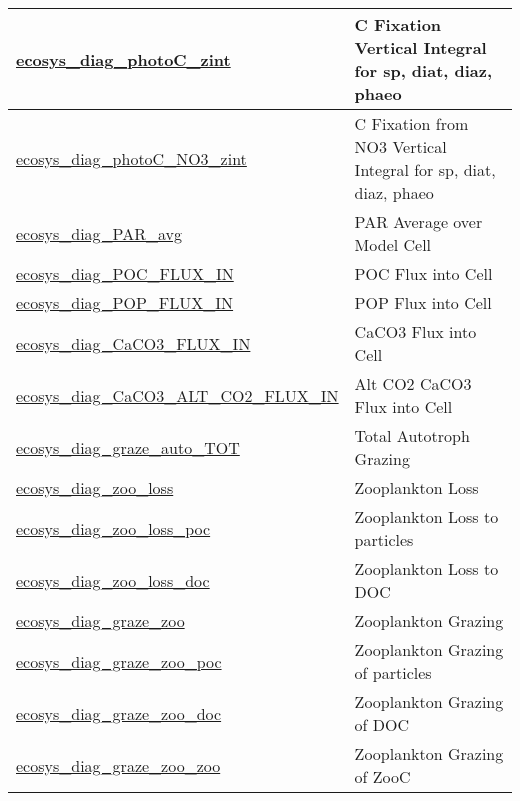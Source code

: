 {\begin{center}
\begin{longtable}{| p{2.0in} | p{4.0in} |}
    \hline
    \hyperref[subsec:var_sec_forcing_ecosys_diag_photoC_zint]{ecosys\_diag\_photoC\_zint} & C Fixation Vertical Integral for sp, diat, diaz, phaeo \\
    \hline
    \hyperref[subsec:var_sec_forcing_ecosys_diag_photoC_NO3_zint]{ecosys\_diag\_photoC\_NO3\_zint} & C Fixation from NO3 Vertical Integral for sp, diat, diaz, phaeo \\
    \hline
    \hyperref[subsec:var_sec_forcing_ecosys_diag_PAR_avg]{ecosys\_diag\_PAR\_avg} & PAR Average over Model Cell \\
    \hline
    \hyperref[subsec:var_sec_forcing_ecosys_diag_POC_FLUX_IN]{ecosys\_diag\_POC\_FLUX\_IN} & POC Flux into Cell \\
    \hline
    \hyperref[subsec:var_sec_forcing_ecosys_diag_POP_FLUX_IN]{ecosys\_diag\_POP\_FLUX\_IN} & POP Flux into Cell \\
    \hline
    \hyperref[subsec:var_sec_forcing_ecosys_diag_CaCO3_FLUX_IN]{ecosys\_diag\_CaCO3\_FLUX\_IN} & CaCO3 Flux into Cell \\
    \hline
    \hyperref[subsec:var_sec_forcing_ecosys_diag_CaCO3_ALT_CO2_FLUX_IN]{ecosys\_diag\_CaCO3\_ALT\_\-CO2\_FLUX\_IN} & Alt CO2 CaCO3 Flux into Cell \\
    \hline
    \hyperref[subsec:var_sec_forcing_ecosys_diag_graze_auto_TOT]{ecosys\_diag\_graze\_auto\_TOT} & Total Autotroph Grazing \\
    \hline
    \hyperref[subsec:var_sec_forcing_ecosys_diag_zoo_loss]{ecosys\_diag\_zoo\_loss} & Zooplankton Loss \\
    \hline
    \hyperref[subsec:var_sec_forcing_ecosys_diag_zoo_loss_poc]{ecosys\_diag\_zoo\_loss\_poc} & Zooplankton Loss to particles \\
    \hline
    \hyperref[subsec:var_sec_forcing_ecosys_diag_zoo_loss_doc]{ecosys\_diag\_zoo\_loss\_doc} & Zooplankton Loss to DOC \\
    \hline
    \hyperref[subsec:var_sec_forcing_ecosys_diag_graze_zoo]{ecosys\_diag\_graze\_zoo} & Zooplankton Grazing \\
    \hline
    \hyperref[subsec:var_sec_forcing_ecosys_diag_graze_zoo_poc]{ecosys\_diag\_graze\_zoo\_poc} & Zooplankton Grazing of particles \\
    \hline
    \hyperref[subsec:var_sec_forcing_ecosys_diag_graze_zoo_doc]{ecosys\_diag\_graze\_zoo\_doc} & Zooplankton Grazing of DOC \\
    \hline
    \hyperref[subsec:var_sec_forcing_ecosys_diag_graze_zoo_zoo]{ecosys\_diag\_graze\_zoo\_zoo} & Zooplankton Grazing of ZooC \\

\end{longtable}
\end{center}}
